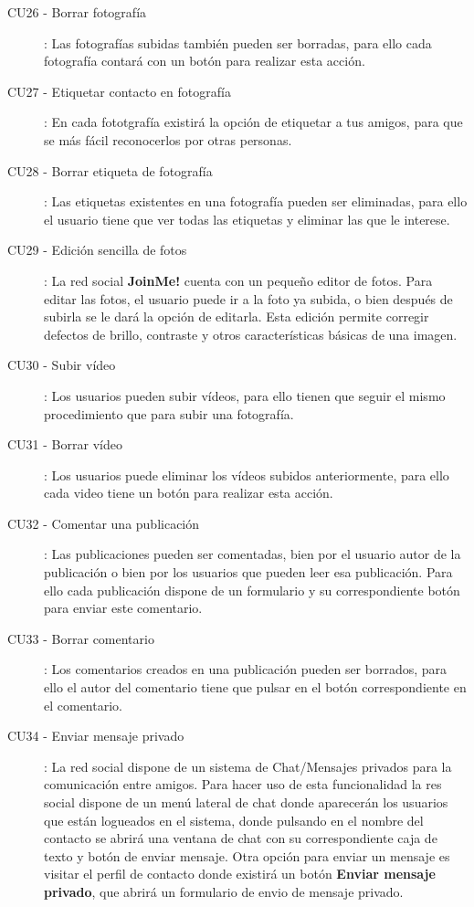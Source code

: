 \documentclass[12pt, a4paper, titlepage]{article}
\begin{document}
\begin{description}
	\item [CU26 - Borrar fotografía]: Las fotografías subidas también pueden ser borradas, para ello cada fotografía contará con un botón para realizar esta acción.
	
	\item [CU27 - Etiquetar contacto en fotografía]: En cada fototgrafía existirá la opción de etiquetar a tus amigos, para que se más fácil reconocerlos por otras personas.
	
	\item [CU28 - Borrar etiqueta de fotografía]: Las etiquetas existentes en una fotografía pueden ser eliminadas, para ello el usuario tiene que ver todas las etiquetas y eliminar las que le interese.
	
	\item [CU29 - Edición sencilla de fotos]: La red social \textbf{JoinMe!} cuenta con un pequeño editor de fotos. Para editar las fotos, el usuario puede ir a la foto ya subida, o bien después de subirla se le dará la opción de editarla. Esta edición permite corregir defectos de brillo, contraste y otros características básicas de una imagen.
	
	\item [CU30 - Subir vídeo]: Los usuarios pueden subir vídeos, para ello tienen que seguir el mismo procedimiento que para subir una fotografía.
	
	\item [CU31 - Borrar vídeo]: Los usuarios puede eliminar los vídeos subidos anteriormente, para ello cada video tiene un botón para realizar esta acción.
	
	\item [CU32 - Comentar una publicación]: Las publicaciones pueden ser comentadas, bien por el usuario autor de la publicación o bien por los usuarios que pueden leer esa publicación. Para ello cada publicación dispone de un formulario y su correspondiente botón para enviar este comentario.
	
	\item [CU33 - Borrar comentario]: Los comentarios creados en una publicación pueden ser borrados, para ello el autor del comentario tiene que pulsar en el botón correspondiente en el comentario.
	
	\item [CU34 - Enviar mensaje privado]: La red social dispone de un sistema de Chat/Mensajes privados para la comunicación entre amigos. Para hacer uso de esta funcionalidad la res social dispone de un menú lateral de chat donde aparecerán los usuarios que están logueados en el sistema, donde pulsando en el nombre del contacto se abrirá una ventana de chat con su correspondiente caja de texto y botón de enviar mensaje. Otra opción para enviar un mensaje es visitar el perfil de contacto donde existirá un botón \textbf{Enviar mensaje privado}, que abrirá un formulario de envio de mensaje privado.
	

\end{description}
\end{document}
